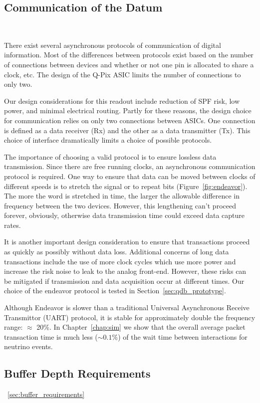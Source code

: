 \subsection{Communication of the Datum}~\label{sec:comms}

There exist several asynchronous protocols of communication of digital information.
Most of the differences between protocols exist based on the number of connections between devices and whether or not one pin is allocated to share a clock, etc.
The design of the Q-Pix ASIC limits the number of connections to only two.

Our design considerations for this readout include reduction of SPF risk, low power, and minimal electrical routing.
Partly for these reasons, the design choice for communication relies on only two connections between ASICs.
One connection is defined as a data receiver (Rx) and the other as a data transmitter (Tx).
This choice of interface dramatically limits a choice of possible protocols.

The importance of choosing a valid protocol is to ensure lossless data transmission.
Since there are free running clocks, an asynchronous communication protocol is required.
One way to ensure that data can be moved between clocks of different speeds is to stretch the signal or to repeat bits (Figure~\ref{fig:endeavor}).
The more the word is stretched in time, the larger the allowable difference in frequency between the two devices.
However, this lengthening can't proceed forever, obviously, otherwise data transmission time could exceed data capture rates.

It is another important design consideration to ensure that transactions proceed as quickly as possibly without data loss.
Additional concerns of long data transactions include the use of more clock cycles which use more power and increase the risk noise to leak to the analog front-end.
However, these risks can be mitigated if transmission and data acquisition occur at different times.
Our choice of the endeavor protocol is tested in Section~\ref{sec:qdb_prototype}.

Although Endeavor is slower than a traditional Universal Asynchronous Receive Transmittor (UART) protocol, it is stable for approximately double the frequency range: $\approx$ 20\%.
In Chapter~\ref{chap:sim} we show that the overall average packet transaction time is much less ($\sim 0.1\%$) of the wait time between interactions for neutrino events.

\subsection{Buffer Depth Requirements}~\ref{sec:buffer_requirements}

